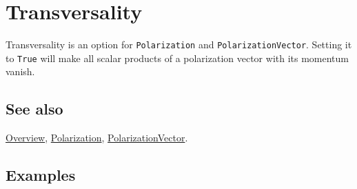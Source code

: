 \documentclass[../FeynCalcManual.tex]{subfiles}
\begin{document}
\hypertarget{transversality}{
\section{Transversality}\label{transversality}}

Transversality is an option for \texttt{Polarization} and
\texttt{PolarizationVector}. Setting it to \texttt{True} will make all
scalar products of a polarization vector with its momentum vanish.

\subsection{See also}

\hyperlink{toc}{Overview}, \hyperlink{polarization}{Polarization},
\hyperlink{polarizationvector}{PolarizationVector}.

\subsection{Examples}
\end{document}

